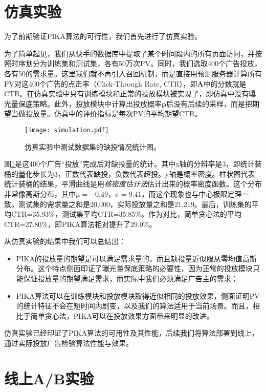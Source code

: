 \section{仿真实验}

为了前期验证PIKA算法的可行性，我们首先进行了仿真实验。

为了简单起见，我们从快手的数据库中提取了某个时间段内的所有页面访问，并按照时序划分为训练集和测试集，各有50万次PV。同时，我们选取400个广告投放，各有50的需求量。这里我们就不再引入召回机制，而是直接用预测服务器计算所有PV对这400个广告的点击率（Click-Through Rate, CTR），即$\bm{A}$中的分数就是CTR。在仿真实验中只有训练模块和正常的投放模块被实现了，即仿真中没有曝光量保底策略。此外，投放模块中计算出投放概率$\bm{p}$后没有后续的采样，而是把期望当做投放量。仿真中的评价指标是每次PV的平均期望CTR。

\begin{figure}[tb]
	\centering
	\texttt{[image: simulation.pdf]}
	\caption{仿真实验中测试数据集的缺投情况统计图。}
	\label{fig:delivery}
\end{figure}

图\ref{fig:delivery}是这400个广告“投放”完成后对缺投量的统计。其中x轴的分辨率是3，即统计装桶的量化步长为3，正数代表缺投，负数代表超投。y轴是概率密度。柱状图代表统计装桶的结果，平滑曲线是用\textit{核密度估计法}估计出来的概率密度函数。这个分布非常像高斯分布，其中$\mu = -0.49$，$\sigma = 9.41$，而这个现象也与中心极限定理一致。测试集的需求量之和是20,000，实际投放量之和是21,219。最后，训练集的平均CTR=35.93\%，测试集平均CTR=35.85\%。作为对比，简单贪心法的平均CTR=27.80\%，即PIKA算法相对提升了29.0\%。

从仿真实验的结果中我们可以总结出：
\begin{itemize}
	\item PIKA的投放量的期望是可以满足需求量的，而且缺投量近似服从零均值高斯分布。这个特点侧面印证了曝光量保底策略的必要性，因为正常的投放模块只能保证投放量的期望满足需求，而实际中我们必须满足广告主的需求；
	\item PIKA算法可以在训练模块和投放模块取得近似相同的投放效果，侧面证明PV的统计特征不会在短时间内剧变，以及我们的算法适用于当前场景。而且，相比于简单贪心法，PIKA可以在投放效果方面带来明显的改进。
\end{itemize}

仿真实验已经印证了PIKA算法的可用性及其性能，后续我们将算法部署到线上，通过实际投放广告检验算法性能与效果。

\section{线上A/B实验}

